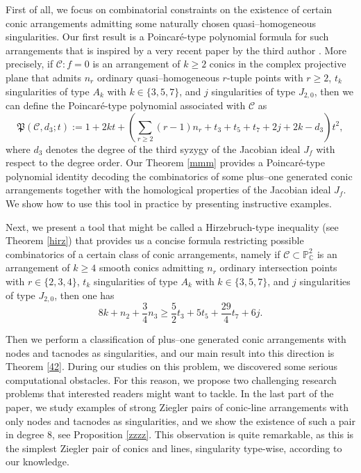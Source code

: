 \documentclass[11pt]{article}
\theoremstyle{plain}
\theoremstyle{definition}
\begin{document}
First of all, we focus on combinatorial constraints on the existence of certain conic arrangements admitting some naturally chosen quasi--homogeneous singularities. Our first result is a Poincar\'e-type polynomial formula for such arrangements that is inspired by a very recent paper by the third author \cite{Pok}. More precisely, if $\mathcal{C} : f=0$ is an arrangement of $k\geq 2$ conics in the complex projective plane that admits $n_r$ ordinary quasi--homogeneous $r$-tuple points with $r\geq 2$, $t_k$ singularities of type $A_k$ with $k \in \{3,5,7\}$, and $j$ singularities of type $J_{2,0}$, then we can define the Poincar\'e-type polynomial associated with $\mathcal{C}$ as
$$\mathfrak{P}(\mathcal{C}, d_3; t):= 1+ 2k t+\left(\sum_{r\geq2}{(r-1)n_r}+t_3+t_5+t_7+2j+2k-d_3\right)t^2,$$
where $d_{3}$ denotes the degree of the third syzygy of the Jacobian ideal $J_f$ with respect to the degree order. Our Theorem \ref{mmm} provides a Poincar\'e-type polynomial identity decoding the combinatorics of some plus--one generated conic arrangements together with the homological properties of the Jacobian ideal $J_{f}$. We show how to use this tool in practice by presenting instructive examples.

Next, we present a tool that might be called a Hirzebruch-type inequality (see Theorem \ref{hirz}) that provides us a concise formula restricting possible combinatorics of a certain class of conic arrangements, namely if $\mathcal{C} \subset \mathbb{P}^{2}_{\mathbb{C}}$ is an arrangement of $k\geq 4$ smooth conics admitting $n_{r}$ ordinary intersection points with $r \in \{2,3,4\}$, $t_{k}$ singularities of type $A_{k}$ with $k \in \{3,5,7\}$, and $j$ singularities of type $J_{2,0}$, then one has
$$8k + n_{2} + \frac{3}{4}n_{3} \geq \frac{5}{2}t_{3} + 5t_{5} + \frac{29}{4}t_{7} + 6j.$$  

Then we perform a classification of plus--one generated conic arrangements with nodes and tacnodes as singularities, and our main result into this direction is Theorem \ref{42}. During our studies on this problem, we discovered some serious computational obstacles. For this reason, we propose two challenging research problems that interested readers might want to tackle. In the last part of the paper, we study examples of strong Ziegler pairs of conic-line arrangements with only nodes and tacnodes as singularities, and we show the existence of such a pair in degree $8$, see Proposition \ref{zzzz}. This observation is quite remarkable, as this is the simplest Ziegler pair of conics and lines, singularity type-wise, according to our knowledge.
\end{document}
